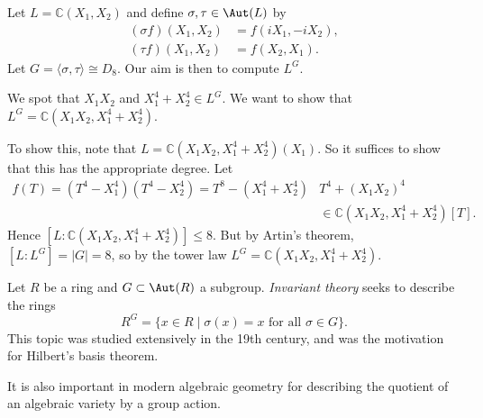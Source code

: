 \documentclass[12pt]{article}
\begin{document}
\begin{exbox}
	Let $L = \mathbb{C}(X_1, X_2)$ and define $\sigma, \tau \in \Aut(L)$ by
	\begin{align*}
		(\sigma f)(X_1, X_2) &= f(i X_1, -iX_2), \\
		(\tau f)(X_1, X_2) &= f(X_2, X_1).
	\end{align*}
	Let $G = \langle \sigma, \tau \rangle \cong D_8$. Our aim is then to compute $L^G$.

	We spot that $X_1 X_2$ and $X_1^4 + X_2^4 \in L^G$. We want to show that $L^G = \mathbb{C}(X_1 X_2, X_1^4 + X_2^4)$.

	To show this, note that $L = \mathbb{C}(X_1 X_2, X_1^4 + X_2^4)(X_1)$. So it suffices to show that this has the appropriate degree. Let
	\begin{align*}
		f(T) = (T^4 - X_1^4)(T^4 - X_2^4) = T^8 - (X_1^4 + X_2^4)&T^4 + (X_1X_2)^4 \\
									 &\in \mathbb{C}(X_1 X_2, X_1^4 + X_2^4)[T].
	\end{align*}
	Hence $[L : \mathbb{C}(X_1 X_2, X_1^4 + X_2^4)] \leq 8$. But by Artin's theorem, $[L:L^G] = |G| = 8$, so by the tower law $L^G = \mathbb{C}(X_1 X_2, X_1^4 + X_2^4)$.
\end{exbox}


Let $R$ be a ring and $G \subset \Aut(R)$ a subgroup. \emph{Invariant theory} seeks to describe the rings
\[
	R^G = \{x \in R \mid \sigma(x) = x \text{ for all } \sigma \in G\}.
\]
This topic was studied extensively in the 19th century, and was the motivation for Hilbert's basis theorem.

It is also important in modern algebraic geometry for describing the quotient of an algebraic variety by a group action.
\end{document}
